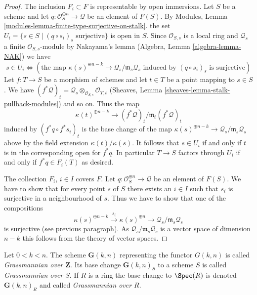\begin{proof}
\medskip\noindent
The inclusion $F_i \subset F$ is representable by open immersions.
Let $S$ be a scheme and let
$q : \mathcal{O}_S^{\oplus n} \to \mathcal{Q}$ be an element of
$F(S)$. By
Modules, Lemma \ref{modules-lemma-finite-type-surjective-on-stalk}.
the set $U_i = \{s \in S \mid (q \circ s_i)_s\text{ surjective}\}$
is open in $S$. Since $\mathcal{O}_{S, s}$ is a local ring
and $\mathcal{Q}_s$ a finite $\mathcal{O}_{S, s}$-module
by Nakayama's lemma (Algebra, Lemma \ref{algebra-lemma-NAK}) we have
$$
s \in U_i \Leftrightarrow
\left(
\text{the map }
\kappa(s)^{\oplus n - k} \to \mathcal{Q}_s/\mathfrak m_s\mathcal{Q}_s
\text{ induced by }
(q \circ s_i)_s
\text{ is surjective}
\right)
$$
Let $f : T \to S$ be a morphism of schemes and let $t \in T$ be a point
mapping to $s \in S$. We have
$(f^*\mathcal{Q})_t =
\mathcal{Q}_s \otimes_{\mathcal{O}_{S, s}} \mathcal{O}_{T, t}$
(Sheaves, Lemma \ref{sheaves-lemma-stalk-pullback-modules})
and so on. Thus the map
$$
\kappa(t)^{\oplus n - k} \to (f^*\mathcal{Q})_t/\mathfrak m_t(f^*\mathcal{Q})_t
$$
induced by $(f^*q \circ f^*s_i)_t$ is the base change of the map
$\kappa(s)^{\oplus n - k} \to \mathcal{Q}_s/\mathfrak m_s\mathcal{Q}_s$
above by the field extension $\kappa(t)/\kappa(s)$. It follows
that $s \in U_i$ if and only if $t$ is in the corresponding open
for $f^*q$. In particular $T \to S$ factors through $U_i$ if
and only if $f^*q \in F_i(T)$ as desired.

\medskip\noindent
The collection $F_i$, $i \in I$ covers $F$. Let
$q : \mathcal{O}_S^{\oplus n} \to \mathcal{Q}$ be an element of
$F(S)$. We have to show that for every point $s$ of $S$ there exists
an $i \in I$ such that $s_i$ is surjective in a neighbourhood of $s$.
Thus we have to show that one of the compositions
$$
\kappa(s)^{\oplus n - k} \xrightarrow{s_i}
\kappa(s)^{\oplus n} \rightarrow
\mathcal{Q}_s/\mathfrak m_s\mathcal{Q}_s
$$
is surjective (see previous paragraph). As
$\mathcal{Q}_s/\mathfrak m_s\mathcal{Q}_s$ is a vector space of
dimension $n - k$ this follows from the theory of vector spaces.
\end{proof}

\begin{definition}
\label{definition-grassmannian}
Let $0 < k < n$. The scheme $\mathbf{G}(k, n)$ representing the functor
$G(k, n)$ is called {\it Grassmannian over $\mathbf{Z}$}.
Its base change $\mathbf{G}(k, n)_S$ to a scheme $S$ is called
{\it Grassmannian over $S$}. If $R$ is a ring the base change
to $\Spec(R)$ is denoted $\mathbf{G}(k, n)_R$ and called
{\it Grassmannian over $R$}.
\end{definition}

